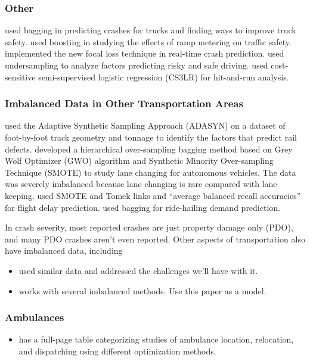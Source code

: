 \subsubsection{Other}
%
\cite{LACK2021106105} used bagging in predicting crashes for trucks and finding ways to improve truck safety.  
%
\cite{HAULE2021106181} used boosting in studying the effects of ramp metering on traffic safety.  
%
\cite{YU2020102740} implemented the new focal loss technique in real-time crash prediction.
%
\cite{SHI2019170} used undersampling to analyze factors predicting risky and safe driving.  
%
\cite{ZHU2021106199} used cost-sensitive semi-supervised logistic regression (CS3LR) for hit-and-run analysis.  



\subsubsection{Imbalanced Data in Other Transportation Areas}

%
\cite{MOHAMMADI2019153} used 
the Adaptive Synthetic Sampling Approach (ADASYN) on a dataset of foot-by-foot track geometry and tonnage to identify the factors that predict rail defects.
%
\cite{SHI2021103414} developed a
hierarchical over-sampling bagging method based on Grey Wolf Optimizer (GWO) algorithm and Synthetic Minority Over-sampling Technique (SMOTE)
to study lane changing for autonomous vehicles.  The data was severely imbalanced because lane changing is rare compared with lane keeping.
%
\cite{KHAN2021103225} used SMOTE and Tomek links and ``average balanced recall accuracies'' for flight delay prediction.  
%
\cite{CHEN2022103709} used bagging for ride-hailing demand prediction.  
 
%
%

In crash severity, most reported crashes are just property damage only (PDO), and many PDO crashes aren't even reported.  Other aspects of transportation also have imbalanced data, including 

\begin{itemize}
	\item \cite{JIANG2020105520} used similar data and addressed the challenges we'll have with it.  
	\item \cite{ELAMRANIABOUELASSAD2020102708} works with several imbalanced methods.  Use this paper as a model.  
\end{itemize}

\subsubsection{Ambulances}

\begin{itemize}
	\item \cite{PARK2019230} has a full-page table categorizing studies of ambulance location, relocation, and dispatching using different optimization methods.  
\end{itemize}

